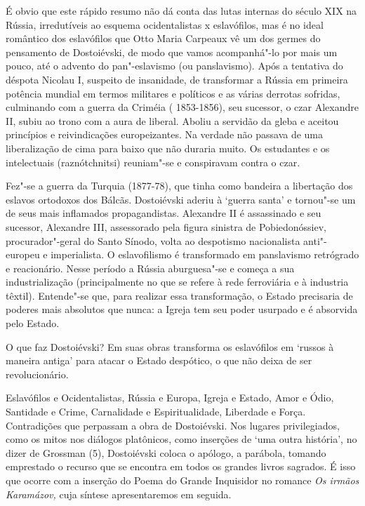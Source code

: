 É obvio que este rápido resumo não dá conta das lutas internas do século
XIX na Rússia, irredutíveis ao esquema ocidentalistas x eslavófilos, mas
é no ideal romântico dos eslavófilos que Otto Maria Carpeaux vê um dos
germes do pensamento de Dostoiévski, de modo que vamos acompanhá"-lo por
mais um pouco, até o advento do pan"-eslavismo (ou panslavismo). Após a
tentativa do déspota Nicolau I, suspeito de insanidade, de transformar a
Rússia em primeira potência mundial em termos militares e políticos e as
várias derrotas sofridas, culminando com a guerra da Criméia (
1853-1856), seu sucessor, o czar Alexandre II, subiu ao trono com a aura
de liberal. Aboliu a servidão da gleba e aceitou princípios e
reivindicações europeizantes. Na verdade não passava de uma
liberalização de cima para baixo que não duraria muito. Os estudantes e
os intelectuais (raznótchnitsi) reuniam"-se e conspiravam contra o czar.

Fez"-se a guerra da Turquia (1877-78), que tinha como bandeira a
libertação dos eslavos ortodoxos dos Bálcãs. Dostoiévski aderiu à
`guerra santa' e tornou"-se um de seus mais inflamados propagandistas.
Alexandre II é assassinado e seu sucessor, Alexandre III, assessorado
pela figura sinistra de Pobiedonóssiev, procurador"-geral do Santo
Sínodo, volta ao despotismo nacionalista anti"-europeu e imperialista. O
eslavofilismo é transformado em panslavismo retrógrado e reacionário.
Nesse período a Rússia aburguesa"-se e começa a sua industrialização
(principalmente no que se refere à rede ferroviária e à industria
têxtil). Entende"-se que, para realizar essa transformação, o Estado
precisaria de poderes mais absolutos que nunca: a Igreja tem seu poder
usurpado e é absorvida pelo Estado.

O que faz Dostoiévski? Em suas obras transforma os eslavófilos em
`russos à maneira antiga' para atacar o Estado despótico, o que não
deixa de ser revolucionário.

Eslavófilos e Ocidentalistas, Rússia e Europa, Igreja e Estado, Amor e
Ódio, Santidade e Crime, Carnalidade e Espiritualidade, Liberdade e
Força. Contradições que perpassam a obra de Dostoiévski. Nos lugares
privilegiados, como os mitos nos diálogos platônicos, como inserções de
`uma outra história', no dizer de Grossman (5), Dostoiévski coloca o
apólogo, a parábola, tomando emprestado o recurso que se encontra em
todos os grandes livros sagrados. É isso que ocorre com a inserção do
Poema do Grande Inquisidor no romance \emph{Os irmãos Karamázov,} cuja
síntese apresentaremos em seguida.

